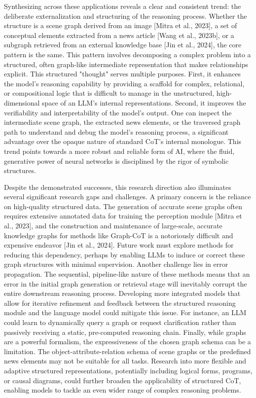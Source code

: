 \documentclass[11pt]{article}
\begin{document}
Synthesizing across these applications reveals a clear and consistent trend: the deliberate externalization and structuring of the reasoning process. Whether the structure is a scene graph derived from an image [Mitra et al., 2023], a set of conceptual elements extracted from a news article [Wang et al., 2023b], or a subgraph retrieved from an external knowledge base [Jin et al., 2024], the core pattern is the same. This pattern involves decomposing a complex problem into a structured, often graph-like intermediate representation that makes relationships explicit. This structured "thought" serves multiple purposes. First, it enhances the model's reasoning capability by providing a scaffold for complex, relational, or compositional logic that is difficult to manage in the unstructured, high-dimensional space of an LLM's internal representations. Second, it improves the verifiability and interpretability of the model's output. One can inspect the intermediate scene graph, the extracted news elements, or the traversed graph path to understand and debug the model's reasoning process, a significant advantage over the opaque nature of standard CoT's internal monologue. This trend points towards a more robust and reliable form of AI, where the fluid, generative power of neural networks is disciplined by the rigor of symbolic structures.

Despite the demonstrated successes, this research direction also illuminates several significant research gaps and challenges. A primary concern is the reliance on high-quality structured data. The generation of accurate scene graphs often requires extensive annotated data for training the perception module [Mitra et al., 2023], and the construction and maintenance of large-scale, accurate knowledge graphs for methods like Graph-CoT is a notoriously difficult and expensive endeavor [Jin et al., 2024]. Future work must explore methods for reducing this dependency, perhaps by enabling LLMs to induce or correct these graph structures with minimal supervision. Another challenge lies in error propagation. The sequential, pipeline-like nature of these methods means that an error in the initial graph generation or retrieval stage will inevitably corrupt the entire downstream reasoning process. Developing more integrated models that allow for iterative refinement and feedback between the structured reasoning module and the language model could mitigate this issue. For instance, an LLM could learn to dynamically query a graph or request clarification rather than passively receiving a static, pre-computed reasoning chain. Finally, while graphs are a powerful formalism, the expressiveness of the chosen graph schema can be a limitation. The object-attribute-relation schema of scene graphs or the predefined news elements may not be suitable for all tasks. Research into more flexible and adaptive structured representations, potentially including logical forms, programs, or causal diagrams, could further broaden the applicability of structured CoT, enabling models to tackle an even wider range of complex reasoning problems.
\end{document}
